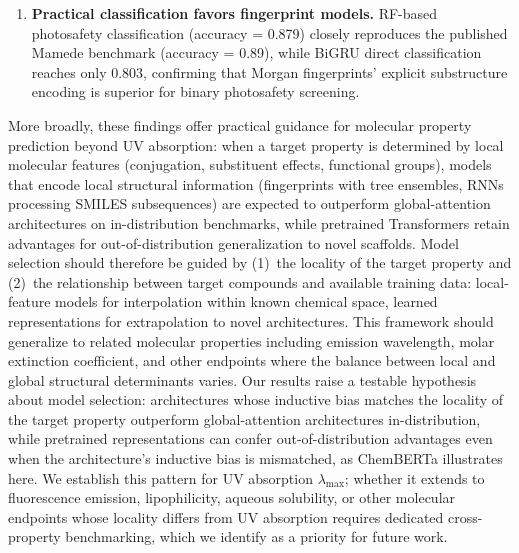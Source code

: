 \documentclass[journal=jcisd8,manuscript=article]{achemso}
\newcommand{\added}[1]{{\color{addedblue}#1}}
\newcommand{\removed}[1]{{\color{removedred}#1}}
\begin{document}
\begin{enumerate}
 \item \textbf{Practical classification favors fingerprint models.}
 RF-based photosafety classification (accuracy = 0.879) closely reproduces the published Mamede benchmark (accuracy = 0.89), while BiGRU direct classification reaches only 0.803, confirming that Morgan fingerprints' explicit substructure encoding is superior for binary photosafety screening.
\end{enumerate}

\removed{More broadly, these findings offer practical guidance for molecular property prediction beyond UV absorption: when a target property is determined by local molecular features (conjugation, substituent effects, functional groups), models that encode local structural information (fingerprints with tree ensembles, RNNs processing SMILES subsequences) are expected to outperform global-attention architectures on in-distribution benchmarks, while pretrained Transformers retain advantages for out-of-distribution generalization to novel scaffolds.}
\removed{Model selection should therefore be guided by (1)~the locality of the target property and (2)~the relationship between target compounds and available training data: local-feature models for interpolation within known chemical space, learned representations for extrapolation to novel architectures.}
\removed{This framework should generalize to related molecular properties including emission wavelength, molar extinction coefficient, and other endpoints where the balance between local and global structural determinants varies.}
\added{Our results raise a testable hypothesis about model selection: architectures whose inductive bias matches the locality of the target property outperform global-attention architectures in-distribution, while pretrained representations can confer out-of-distribution advantages even when the architecture's inductive bias is mismatched, as ChemBERTa illustrates here. We establish this pattern for UV absorption $\lambda_{\max}$; whether it extends to fluorescence emission, lipophilicity, aqueous solubility, or other molecular endpoints whose locality differs from UV absorption requires dedicated cross-property benchmarking, which we identify as a priority for future work.}
\end{document}
